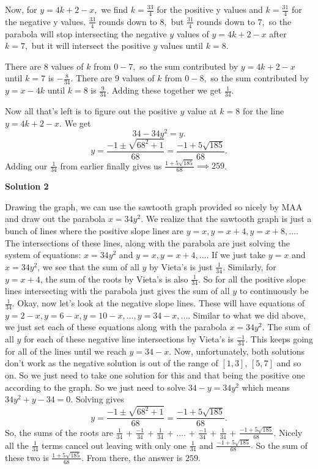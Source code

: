 \begin{enumerate}
 
Now, for $y = 4k + 2 - x,$ we find $k = \frac{33}{4}$ for the positive y values and $k = \frac{31}{4}$ for the negative y values. $\frac{33}{4}$ rounds down to $8,$ but $\frac{31}{4}$ rounds down to $7,$ so the parabola will stop intersecting the negative $y$ values of $y = 4k + 2 - x$ after $k = 7,$ but it will intersect the positive $y$ values until $k = 8.$ 

 
There are $8$ values of $k$ from $0 - 7,$ so the sum contributed by $y = 4k + 2 - x$ until $k = 7$ is $-\frac{8}{34}.$ There are $9$ values of $k$ from $0 - 8,$ so the sum contributed by $y = x - 4k$ until $k = 8$ is $\frac{9}{34}.$ Adding these together we get $\frac{1}{34}.$ 

 
Now all that's left is to figure out the positive $y$ value at $k = 8$ for the line $y = 4k + 2 - x.$ We get 
 \[34-34y^2 = y.\] 
 \[y = \frac{-1 \pm \sqrt{68^2 + 1}}{68} = \frac{-1 + 5 \sqrt{185}}{68}.\] Adding our $\frac{1}{34}$ from earlier finally gives us $\frac{1 + 5 \sqrt{185}}{68} \implies \boxed{259}$.

 



\textbf{Solution 2}

Drawing the graph, we can use the sawtooth graph provided so nicely by MAA and draw out the parabola $x = 34y^2$. We realize that the sawtooth graph is just a bunch of lines where the positive slope lines are $y = x, y = x + 4, y = x + 8,...$. The intersections of these lines, along with the parabola are just solving the system of equations: $x = 34y^2$ and $y = x, y = x + 4, ...$. If we just take $y = x$ and $x = 34y^2$, we see that the sum of all $y$ by Vieta's is just $\frac{1}{34}$. Similarly, for $y = x + 4$, the sum of the roots by Vieta's is also $\frac{1}{34}$. So for all the positive slope lines intersecting with the parabola just gives the sum of all $y$ to continuously be $\frac{1}{34}$. Okay, now let's look at the negative slope lines. These will have equations of $y = 2 - x, y = 6 - x, y = 10 - x, ..., y = 34 - x, ...$. Similar to what we did above, we just set each of these equations along with the parabola $x = 34y^2$. The sum of all $y$ for each of these negative line intersections by Vieta's is $\frac{-1}{34}$. This keeps going for all of the lines until we reach $y = 34 - x$. Now, unfortunately, both solutions don't work as the negative solution is out of the range of $[1 , 3]$, $[5, 7]$ and so on. So we just need to take one solution for this and that being the positive one according to the graph. So we just need to solve $34 - y = 34y^2$ which means $34y^2 + y - 34 = 0$. Solving gives
 \[y = \frac{-1 \pm \sqrt{68^2 + 1}}{68} = \frac{-1 + 5 \sqrt{185}}{68}.\]So, the sums of the roots are $\frac{1}{34}$ + $\frac{-1}{34}$ + $\frac{1}{34}$ + .... + $\frac{-1}{34}$ + $\frac{1}{34}$ + $\frac{-1 + 5 \sqrt{185}}{68}.$ Nicely all the $\frac{1}{34}$ terms cancel out leaving with only one $\frac{1}{34}$ and $\frac{-1 + 5 \sqrt{185}}{68}.$ So the sum of these two is $\frac{1 + 5 \sqrt{185}}{68}.$ From there, the answer is $\boxed{259}$.


\end{enumerate}
